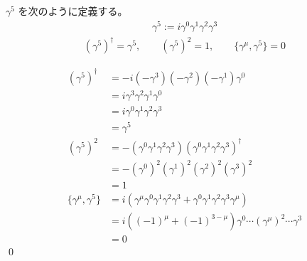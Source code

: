 \documentclass[uplatex,dvipdfmx,a4paper,11pt]{jlreq}
\makeatletter
\numberwithin{equation}{section}
\theoremstyle{definition}
\renewenvironment{proof}[1][\proofname]{\par
  \normalfont
  \topsep6\p@\@plus6\p@ \trivlist
  \item[\hskip\labelsep{\bfseries #1}\@addpunct{\bfseries}]\ignorespaces\quad\par
}{%
  \qed\endtrivlist\@endpefalse
}
\renewcommand\proofname{証明}
\makeatother
\begin{document}
\begin{proposition}
  $\gamma^5$ を次のように定義する。
  \begin{align}
    \gamma^5 := i\gamma^0\gamma^1\gamma^2\gamma^3
  \end{align}
  \begin{align}
    (\gamma^5)^\dagger = \gamma^5, \qquad (\gamma^5)^2 = 1, \qquad \lbrace\gamma^\mu, \gamma^5\rbrace = 0
  \end{align}
\end{proposition}
\begin{proof}
  \begin{align}
    (\gamma^5)^\dagger                 & = -i(-\gamma^3)(-\gamma^2)(-\gamma^1)\gamma^0                                                \\
                                       & = i\gamma^3\gamma^2\gamma^1\gamma^0                                                          \\
                                       & = i\gamma^0\gamma^1\gamma^2\gamma^3                                                          \\
                                       & = \gamma^5                                                                                   \\
    (\gamma^5)^2                       & = -(\gamma^0\gamma^1\gamma^2\gamma^3)(\gamma^0\gamma^1\gamma^2\gamma^3)^\dagger              \\
                                       & = - (\gamma^0)^2(\gamma^1)^2(\gamma^2)^2(\gamma^3)^2                                         \\
                                       & = 1                                                                                          \\
    \lbrace\gamma^\mu, \gamma^5\rbrace & = i(\gamma^\mu\gamma^0\gamma^1\gamma^2\gamma^3 + \gamma^0\gamma^1\gamma^2\gamma^3\gamma^\mu) \\
                                       & = i((-1)^\mu + (-1)^{3-\mu})\gamma^0\cdots(\gamma^\mu)^2\cdots\gamma^3                       \\
                                       & = 0
  \end{align}
\end{proof}
\end{document}
